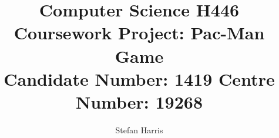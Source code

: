 \documentclass[letterpaper, 11pt]{article}
\author{Stefan Harris}
\date{}
\title{Computer Science H446 Coursework Project: Pac-Man Game\\\medskip
\large Candidate Number: 1419 Centre Number: 19268}
\begin{document}
\maketitle
\tableofcontents

\printbibliography
\autocite{pygameAbout}
\autocite{SDLIntro}
\autocite{kidsCanCodeLessions}
\autocite{stackoverflowSmoothTileMovement}
\autocite{gamesAtAGlance}
\autocite{pacmanDoodle}
\autocite{20x20Tileset}
\autocite{kidsCanCodeTileBasedGameP2}
\autocite{fileEncryptAndDecrypt}
\autocite{kidsCanCodePlatformerP7Github}
\autocite{kidsCanCodePlatformerP7Video}
\autocite{pythonTutorialPrivateAttributes}
\autocite{stackExchangeCollisionBox}
\autocite{kidsCanCodePlatformerP18Github}
\autocite{tiledLevelEditor}
\autocite{pyTMX}
\autocite{kidsCanCodeTiledBasedGameP11Video}
\autocite{kidsCanCodeTiledBasedGameP12Video}
\autocite{kidsCanCodeTiledBasedGameP13Video}
\autocite{stackoverflowChangingSpriteColors}
\autocite{stackoverflowTransparentRectangle}
\autocite{RetroGameMechanicsExplained}
\end{document}
